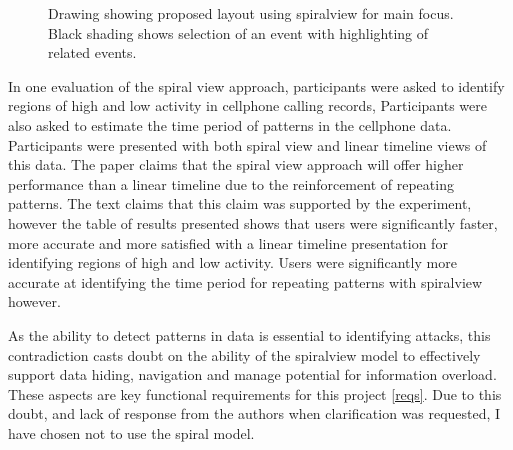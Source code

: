 \begin{figure}[tbh]
\caption{\protect\label{spiral_plan}Drawing showing proposed layout using spiralview for main focus. Black shading shows selection of an event with highlighting of related events.}
\end{figure}
 
In one evaluation of the spiral view approach, participants were asked to identify regions of high and low activity in cellphone calling records, Participants were also asked to estimate the time period of patterns in the cellphone data. Participants were presented with both spiral view and linear timeline views of this data. The paper \cite{chin2009visual} claims that the spiral view approach will offer higher performance than a linear timeline due to the reinforcement of repeating patterns. The text claims that this claim was supported by the experiment, however the table of results presented shows that users were significantly faster, more accurate and more satisfied with a linear timeline presentation for identifying regions of high and low activity. Users were significantly more accurate at identifying the time period for repeating patterns with spiralview however.  

As the ability to detect patterns in data is essential to identifying attacks, this contradiction casts doubt on the ability of the spiralview model to effectively support data hiding, navigation and manage potential for information overload. These aspects are key functional requirements for this project \ref{reqs}. Due to this doubt, and lack of response from the authors when clarification was requested, I have chosen not to use the spiral model. 

